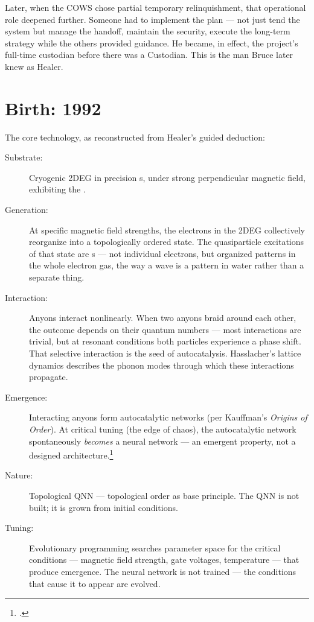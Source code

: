 Later, when the COWS chose partial temporary relinquishment, that operational role deepened further. Someone had to implement the plan --- not just tend the system but manage the handoff, maintain the security, execute the long-term strategy while the others provided guidance. He became, in effect, the project's full-time custodian before there was a Custodian. This is the man Bruce later knew as Healer.

\section*{Birth: 1992}
\label{record:fl-birth}

The core technology, as reconstructed from Healer's guided deduction:

\begin{description}
\item[Substrate:] Cryogenic 2DEG in precision s, under strong perpendicular magnetic field, exhibiting the .

\item[Generation:] At specific magnetic field strengths, the electrons in the 2DEG collectively reorganize into a topologically ordered state. The quasiparticle excitations of that state are s --- not individual electrons, but organized patterns in the whole electron gas, the way a wave is a pattern in water rather than a separate thing.

\item[Interaction:] Anyons interact nonlinearly. When two anyons braid around each other, the outcome depends on their quantum numbers --- most interactions are trivial, but at resonant conditions both particles experience a phase shift. That selective interaction is the seed of autocatalysis. Hasslacher's lattice dynamics describes the phonon modes through which these interactions propagate.

\item[Emergence:] Interacting anyons form autocatalytic networks (per Kauffman's \textit{Origins of Order}). At critical tuning (the edge of chaos), the autocatalytic network spontaneously \textit{becomes} a neural network --- an emergent property, not a designed architecture.\footcite{kauffman1993}

\item[Nature:] Topological QNN --- topological order as base principle. The QNN is not built; it is grown from initial conditions.

\item[Tuning:] Evolutionary programming searches parameter space for the critical conditions --- magnetic field strength, gate voltages, temperature --- that produce emergence. The neural network is not trained --- the conditions that cause it to appear are evolved.
\end{description}

